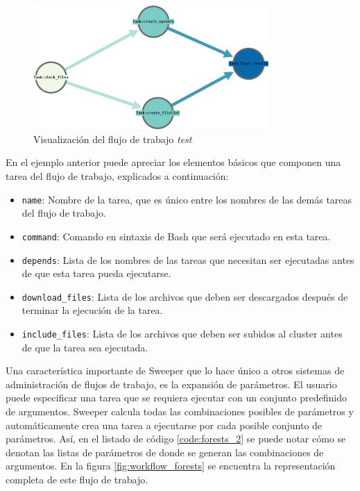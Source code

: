 \begin{figure}
\begin{center}
\includegraphics[width=0.8\textwidth]{imagenes/workflow_test.png}
\end{center}
\caption{Visualización del flujo de trabajo \emph{test} }
\label{fig:workflow_test}
\end{figure}


En el ejemplo anterior puede apreciar los elementos básicos que componen una tarea del flujo de trabajo, explicados a continuación:

\begin{itemize}
\item{\texttt{name}: Nombre de la tarea, que es único entre los nombres de las demás tareas del flujo de trabajo.}
\item{\texttt{command}: Comando en sintaxis de Bash que será ejecutado en esta tarea.}
\item{\texttt{depends}: Lista de los nombres de las tareas que necesitan ser ejecutadas antes de que esta tarea pueda ejecutarse.}
\item{\texttt{download\_files}: Lista de los archivos que deben ser descargados después de terminar la ejecución de la tarea.}
\item{\texttt{include\_files}: Lista de los archivos que deben ser subidos al cluster antes de que la tarea sea ejecutada.}
\end{itemize}

Una característica importante de Sweeper que lo hace único a otros sistemas de administración de flujos de trabajo, es la expansión de parámetros. El usuario puede especificar una tarea que se requiera ejecutar con un conjunto predefinido de argumentos. Sweeper calcula todas las combinaciones posibles de parámetros y automáticamente crea una tarea a ejecutarse por cada posible conjunto de parámetros. Así, en el listado de código \ref{code:forests_2} se puede notar cómo se denotan las listas de parámetros de donde se generan las combinaciones de argumentos. En la figura \ref{fig:workflow_forests} se encuentra la representación completa de este flujo de trabajo.

